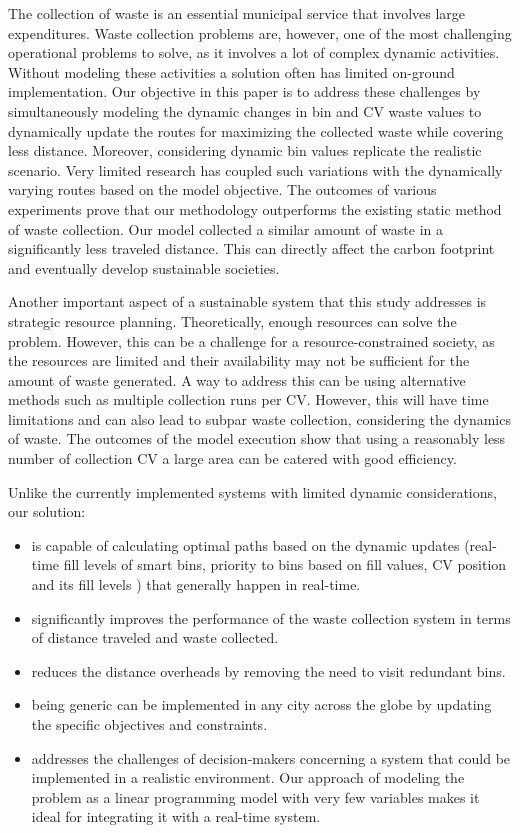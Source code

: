 \documentclass[12pt]{article}
\begin{document}
The collection of waste is an essential municipal service that involves large expenditures. Waste collection problems are, however, one of the most challenging operational problems to solve, as it involves a lot of complex dynamic activities. Without modeling these activities a solution often has limited on-ground implementation. Our objective in this paper is to address these challenges by simultaneously modeling the dynamic changes in bin and CV waste values to dynamically update the routes for maximizing the collected waste while covering less distance. Moreover, considering dynamic bin values replicate the realistic scenario. Very limited research has coupled such variations with the dynamically varying routes based on the model objective. The outcomes of various experiments prove that our methodology outperforms the existing static method of waste collection. Our model collected a similar amount of waste in a significantly less traveled distance. This can directly affect the carbon footprint and eventually develop sustainable societies.

Another important aspect of a sustainable system that this study addresses is strategic resource planning. Theoretically, enough resources can solve the problem. However, this can be a challenge for a resource-constrained society, as the resources are limited and their availability may not be sufficient for the amount of waste generated. A way to address this can be using alternative methods such as multiple collection runs per CV. However, this will have time limitations and can also lead to subpar waste collection, considering the dynamics of waste. The outcomes of the model execution show that using a reasonably less number of collection CV a large area can be catered with good efficiency.

Unlike the currently implemented systems with limited dynamic considerations, our solution:
\begin{itemize}
   
    \item is capable of calculating optimal paths based on the dynamic updates (real-time fill levels of smart bins, priority to bins based on fill values, CV position and its fill levels ) that generally happen in real-time.
    \item significantly improves the performance of the waste collection system in terms of distance traveled and waste collected.
    \item reduces the distance overheads by removing the need to visit redundant bins.
    \item being generic can be implemented in any city across the globe by updating the specific objectives and constraints. 
    
    \item addresses the challenges of decision-makers concerning a system that could be implemented in a realistic environment. Our approach of modeling the problem as a linear programming model with very few variables makes it ideal for integrating it with a real-time system.


\end{itemize}
\end{document}
